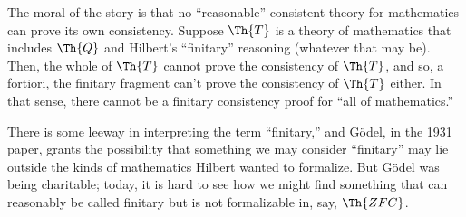 \documentclass[../../../include/open-logic-section]{subfiles}
\begin{document}
\begin{digress}
The moral of the story is that no ``reasonable'' consistent theory for
mathematics can prove its own consistency. Suppose $\Th{T}$ is a
theory of mathematics that includes $\Th{Q}$ and Hilbert's
``finitary'' reasoning (whatever that may be). Then, the whole of
$\Th{T}$ cannot prove the consistency of $\Th{T}$, and so, a fortiori,
the finitary fragment can't prove the consistency of $\Th{T}$
either. In that sense, there cannot be a finitary consistency proof
for ``all of mathematics.''

There is some leeway in interpreting the term ``finitary,'' and G\"odel, in
the 1931 paper, grants the possibility that something we may consider
``finitary'' may lie outside the kinds of mathematics Hilbert wanted
to formalize. But G\"odel was being charitable; today, it is hard to
see how we might find something that can reasonably be called finitary
but is not formalizable in, say, $\Th{ZFC}$.
\end{digress}
\end{document}
